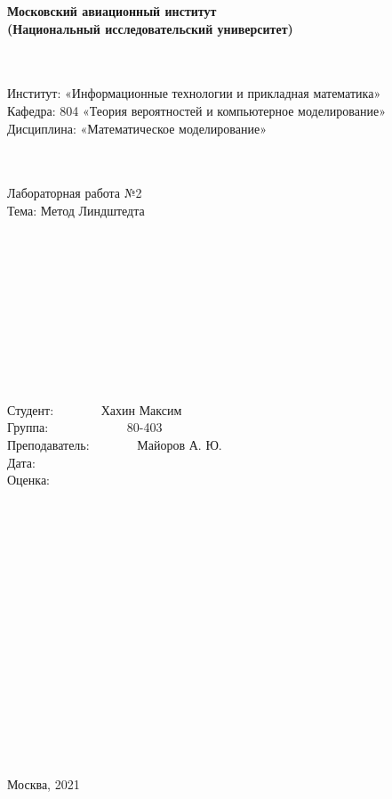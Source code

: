 \documentclass[12pt]{article}
\begin{document}
    \begin{center}
        \textbf{Московский авиационный институт} \\
        \textbf{(Национальный исследовательский университет)}
    \end{center} 
    ~\\
    ~\\
    Институт: «Информационные технологии и прикладная математика» \\
    Кафедра: 804 «Теория вероятностей и компьютерное моделирование» \\
    Дисциплина: «Математическое моделирование»  
    ~\\
    ~\\
    ~\\
    \begin{center}
        Лабораторная работа №2 \\
        Тема: Метод Линдштедта
    \end{center}
    ~\\
    ~\\
    ~\\
    ~\\
    ~\\
    ~\\
    ~\\
    ~\\
    ~\\
    \begin{flushright}
        Студент: ~~~~~~~Хахин Максим~~~~~~~~~~~\\
        Группа: ~~~~~~~~~~~~80-403~~~~~~~~~~~~~~~~~~~\\
        Преподаватель:~~~~~~~ Майоров А. Ю.\\
        Дата: ~~~~~~~~~~~~~~~~~~~~~~~~~~~~~~~~~~~~~~~~~~~\\
        Оценка:~~~~~~~~~~~~~~~~~~~~~~~~~~~~~~~~~~~~~~~~~\\
    \end{flushright}
    ~\\
    ~\\
    ~\\
    ~\\
    ~\\
    ~\\
    ~\\
    ~\\
    ~\\
    ~\\
    ~\\
    ~\\
    ~\\
    ~\\
    ~\\
    \begin{center}
        Москва, 2021
    \end{center}
    \pagestyle{empty}
    \newpage
\end{document}

